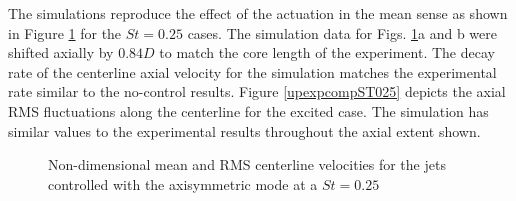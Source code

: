 \documentclass[english]{aiaa-tc}
\begin{document}
The simulations reproduce the effect of the actuation in the mean sense as shown in Figure \ref{expcompST025} for the $St=0.25$ cases.
The simulation data for Figs. \ref{expcompST025}a and b were shifted axially by $0.84D$ to match the core length of the experiment. The decay rate of the centerline axial velocity for the simulation matches the experimental rate similar to the no-control results.  Figure \ref{upexpcompST025} depicts the axial RMS fluctuations along the centerline for the excited case. The simulation has similar values to the experimental results throughout the axial extent shown.
\begin{figure}
\begin{center}
\caption{Non-dimensional mean and RMS centerline velocities for the jets controlled with the axisymmetric mode at a $St=0.25$\label{expcompST025}}
\end{center}
 \end{figure}
\end{document}
